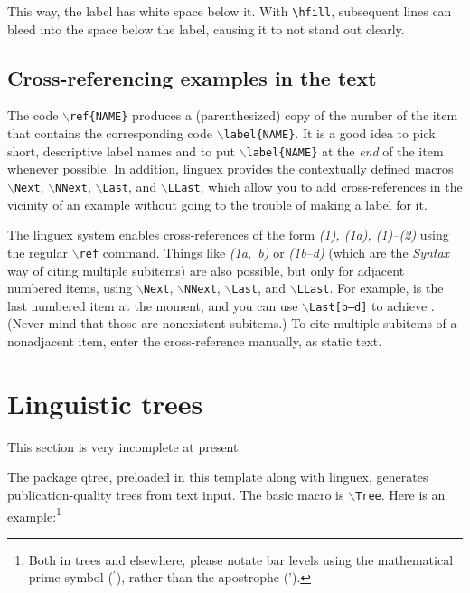\documentclass[letterpaper,12pt, twoside]{article}
\begin{document}
\noindent This way, the label has white space below it. With \verb|\hfill|, subsequent lines can bleed into the space below the label, causing it to not stand out clearly. 


\subsection{Cross-referencing examples in the text}\label{seccross}

The code \texttt{$\backslash$ref\{NAME\}} produces a (parenthesized) copy of the number of the item that contains the corresponding code \texttt{$\backslash$label\{NAME\}}. It is a good idea to pick short, descriptive label names and to put \texttt{$\backslash$label\{NAME\}} at the \emph{end} of the item whenever possible. In addition, {linguex} provides the contextually defined macros \texttt{$\backslash$Next}, \texttt{$\backslash$NNext}, \texttt{$\backslash$Last}, and \texttt{$\backslash$LLast}, which allow you to add cross-references in the vicinity of an example without going to the trouble of making a label for it. 

The {linguex} system enables cross-references of the form \emph{(1), (1a), (1)--(2)}  using the regular \texttt{$\backslash$ref{}} command. Things like \emph{(1a,~b)} or \emph{(1b--d)}  (which are the \emph{Syntax} way of citing multiple subitems) are also possible, but only for adjacent numbered items, using  \texttt{$\backslash$Next}, \texttt{$\backslash$NNext}, \texttt{$\backslash$Last}, and \texttt{$\backslash$LLast}. For example, \Last is the last numbered item at the moment, and you can use \texttt{$\backslash$Last[b--d]} to achieve \emph{\Last[b--d]}. (Never mind that those are nonexistent subitems.) To cite multiple subitems of a nonadjacent item, enter the cross-reference manually, as static text.







\section{Linguistic trees}\label{sectrees}
This section is very incomplete at present.

The package {qtree}, preloaded in this template along with {linguex}, generates publication-quality trees from text input. The basic macro is \texttt{$\backslash$Tree}. Here is an example:\footnote{Both in trees and elsewhere, please notate bar levels using the mathematical prime symbol ($^\prime$), rather than the apostrophe (').\label{noteprime}}
\end{document}
